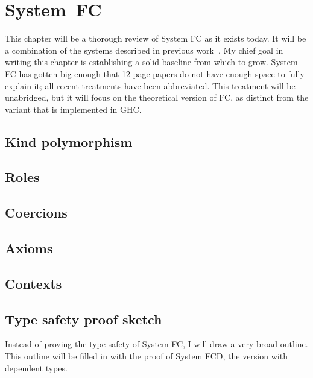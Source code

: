 \chapter{System~FC}
\label{cha:system-fc}

\begin{proposal}
This chapter will be a thorough review of System FC as it exists today.
It will be a combination of the systems described in previous
work~\cite{promotion,safe-coercions,closed-type-families}. My chief
goal in writing this chapter is establishing a solid baseline from which
to grow. System FC has gotten big enough that 12-page papers do not have
enough space to fully explain it; all recent treatments have been abbreviated.
This treatment will be unabridged, but it will focus on the theoretical
version of FC, as distinct from the variant that is implemented in GHC.
\end{proposal}

\section{Kind polymorphism}

\section{Roles}

\section{Coercions}

\section{Axioms}

\section{Contexts}

\section{Type safety proof sketch}

\begin{proposal}
Instead of proving the type safety of System FC, I will draw a very broad
outline. This outline will be filled in with the proof of System FCD, the
version with dependent types.
\end{proposal}

